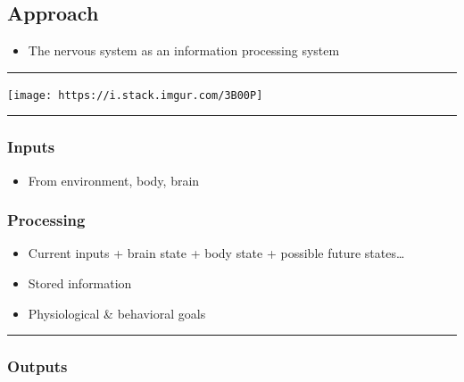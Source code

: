 \documentclass[]{article}
\providecommand{\tightlist}{%
  \setlength{\itemsep}{0pt}\setlength{\parskip}{0pt}}
\begin{document}
\hypertarget{approach-1}{%
\subsection{Approach}\label{approach-1}}

\begin{itemize}
\tightlist
\item
  The nervous system as an information processing system
\end{itemize}

\begin{center}\rule{0.5\linewidth}{\linethickness}\end{center}

\begin{center}\texttt{[image: https://i.stack.imgur.com/3B00P]} \end{center}

\begin{center}\rule{0.5\linewidth}{\linethickness}\end{center}

\hypertarget{inputs}{%
\subsubsection{\texorpdfstring{\textbf{Inputs}}{Inputs}}\label{inputs}}

\begin{itemize}
\tightlist
\item
  From environment, body, brain
\end{itemize}

\hypertarget{processing}{%
\subsubsection{\texorpdfstring{\textbf{Processing}}{Processing}}\label{processing}}

\begin{itemize}
\tightlist
\item
  Current inputs + brain state + body state + possible future
  states\ldots{}
\item
  Stored information
\item
  Physiological \& behavioral goals
\end{itemize}

\begin{center}\rule{0.5\linewidth}{\linethickness}\end{center}

\hypertarget{outputs}{%
\subsubsection{\texorpdfstring{\textbf{Outputs}}{Outputs}}\label{outputs}}
\end{document}
